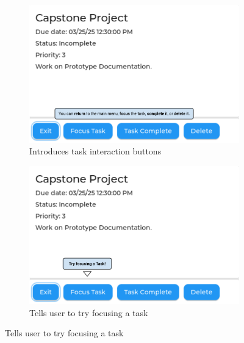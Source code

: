 \begin{figure}[h]
    \begin{subfigure}{0.5\textwidth}
        \includegraphics[width = \textwidth]{task_buttons.png}
        \caption{Introduces task interaction buttons}
    \end{subfigure}
    \begin{subfigure}{0.5\textwidth}
        \includegraphics[width = \textwidth]{try_focus.png}
        \caption{Tells user to try focusing a task}
    \end{subfigure}
\end{figure}
